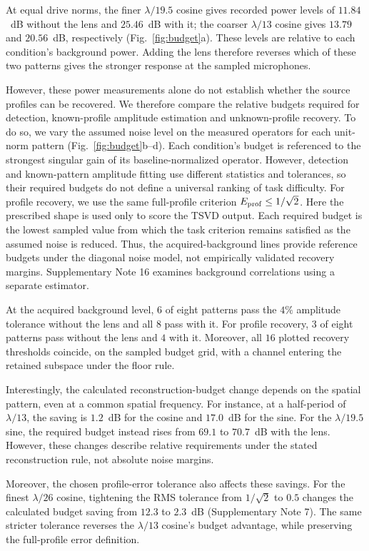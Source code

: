 \documentclass[lineno,pdflatex,sn-nature]{sn-jnl}%
\theoremstyle{thmstyleone}%
\theoremstyle{thmstyletwo}%
\theoremstyle{thmstylethree}%
\begin{document}
At equal drive norms, the finer $\lambda/19.5$ cosine gives recorded power levels of $11.84$~dB without the lens and $25.46$~dB with it; the coarser $\lambda/13$ cosine gives $13.79$ and $20.56$~dB, respectively (Fig.~\ref{fig:budget}a). These levels are relative to each condition's background power. Adding the lens therefore reverses which of these two patterns gives the stronger response at the sampled microphones.

However, these power measurements alone do not establish whether the source profiles can be recovered. We therefore compare the relative budgets required for detection, known-profile amplitude estimation and unknown-profile recovery. To do so, we vary the assumed noise level on the measured operators for each unit-norm pattern (Fig.~\ref{fig:budget}b--d). Each condition's budget is referenced to the strongest singular gain of its baseline-normalized operator. However, detection and known-pattern amplitude fitting use different statistics and tolerances, so their required budgets do not define a universal ranking of task difficulty. For profile recovery, we use the same full-profile criterion $E_{\rm prof}\le1/\sqrt2$. Here the prescribed shape is used only to score the TSVD output. Each required budget is the lowest sampled value from which the task criterion remains satisfied as the assumed noise is reduced. Thus, the acquired-background lines provide reference budgets under the diagonal noise model, not empirically validated recovery margins. Supplementary Note 16 examines background correlations using a separate estimator.

At the acquired background level, $6$ of eight patterns pass the $4\%$ amplitude tolerance without the lens and all $8$ pass with it. For profile recovery, $3$ of eight patterns pass without the lens and $4$ with it. Moreover, all $16$ plotted recovery thresholds coincide, on the sampled budget grid, with a channel entering the retained subspace under the floor rule.

Interestingly, the calculated reconstruction-budget change depends on the spatial pattern, even at a common spatial frequency. For instance, at a half-period of $\lambda/13$, the saving is $1.2$~dB for the cosine and $17.0$~dB for the sine. For the $\lambda/19.5$ sine, the required budget instead rises from $69.1$ to $70.7$~dB with the lens. However, these changes describe relative requirements under the stated reconstruction rule, not absolute noise margins.

Moreover, the chosen profile-error tolerance also affects these savings. For the finest $\lambda/26$ cosine, tightening the RMS tolerance from $1/\sqrt2$ to $0.5$ changes the calculated budget saving from $12.3$ to $2.3$~dB (Supplementary Note 7). The same stricter tolerance reverses the $\lambda/13$ cosine's budget advantage, while preserving the full-profile error definition.
\end{document}
